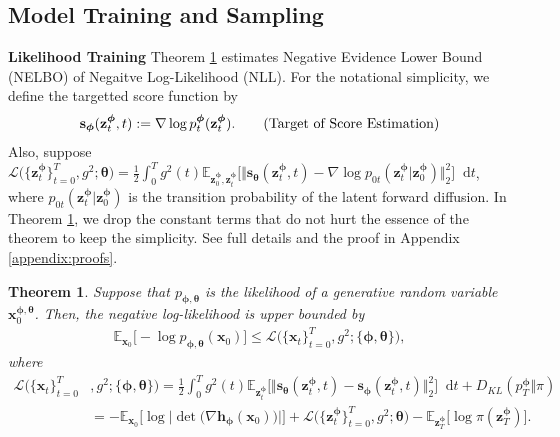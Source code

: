 \documentclass{article}
\newtheorem{theorem}{Theorem}\newtheorem{proposition}{Proposition}
\theoremstyle{definition}
\theoremstyle{remark}
\newcommand*\diff{\mathop{}\!\mathrm{d}}
\begin{document}
	
	
	\subsection{Model Training and Sampling}
	
	\textbf{Likelihood Training} Theorem \ref{thm:1} estimates Negative Evidence Lower Bound (NELBO) of Negaitve Log-Likelihood (NLL). For the notational simplicity, we define the targetted score function by
	\begin{align*}
	\mathbf{s}_{\bm{\phi}}(\mathbf{z}_{t}^{\bm{\phi}},t):=\nabla\log{p_{t}^{\bm{\phi}}(\mathbf{z}_{t}^{\bm{\phi}})}.\tag{\text{Target of Score Estimation}}
	\end{align*}
	Also, suppose $\mathcal{L}\big(\{\mathbf{z}_{t}^{\bm{\phi}}\}_{t=0}^{T},g^{2};\bm{\theta}\big)=\frac{1}{2}\int_{0}^{T}g^{2}(t)\mathbb{E}_{\mathbf{z}_{0}^{\bm{\phi}},\mathbf{z}_{t}^{\bm{\phi}}}\big[\Vert\mathbf{s}_{\bm{\theta}}(\mathbf{z}_{t}^{\bm{\phi}},t)-\nabla\log{p_{0t}(\mathbf{z}_{t}^{\bm{\phi}}\vert\mathbf{z}_{0}^{\bm{\phi}})}\Vert_{2}^{2}\big]\diff t$, where $p_{0t}(\mathbf{z}_{t}^{\bm{\phi}}\vert\mathbf{z}_{0}^{\bm{\phi}})$ is the transition probability of the latent forward diffusion. In Theorem \ref{thm:1}, we drop the constant terms that do not hurt the essence of the theorem to keep the simplicity. See full details and the proof in Appendix \ref{appendix:proofs}.
	\reqnomode
	\begin{theorem}\label{thm:1}
		Suppose that $p_{\bm{\phi},\bm{\theta}}$ is the likelihood of a generative random variable $\mathbf{x}_{0}^{\bm{\phi},\bm{\theta}}$. Then, the negative log-likelihood is upper bounded by
		\begin{align*}
		\mathbb{E}_{\mathbf{x}_{0}}\big[-\log{p_{\bm{\phi},\bm{\theta}}(\mathbf{x}_{0})}\big]\le\mathcal{L}\big(\{\mathbf{x}_{t}\}_{t=0}^{T},g^{2};\{\bm{\phi},\bm{\theta}\}\big),
		\end{align*}
		where
		\begin{align}
		\mathcal{L}\big(\{\mathbf{x}_{t}\}_{t=0}^{T}&,g^{2};\{\bm{\phi},\bm{\theta}\}\big)=\frac{1}{2}\int_{0}^{T}g^{2}(t)\mathbb{E}_{\mathbf{z}_{t}^{\bm{\phi}}}\big[\Vert\mathbf{s}_{\bm{\theta}}(\mathbf{z}_{t}^{\bm{\phi}},t)-\mathbf{s}_{\bm{\phi}}(\mathbf{z}_{t}^{\bm{\phi}},t)\Vert_{2}^{2}\big]\diff t+D_{KL}(p_{T}^{\bm{\phi}}\Vert \pi)\label{main_eq:nelbo}\\[1ex]
		&=-\mathbb{E}_{\mathbf{x}_{0}}\big[\log{\big\vert\det\big(\nabla\mathbf{h}_{\bm{\phi}}(\mathbf{x}_{0})\big)\big\vert}\big]+\mathcal{L}\big(\{\mathbf{z}_{t}^{\bm{\phi}}\}_{t=0}^{T},g^{2};\bm{\theta}\big)-\mathbb{E}_{\mathbf{z}_{T}^{\bm{\phi}}}\big[\log{\pi(\mathbf{z}_{T}^{\bm{\phi}})}\big].\label{main_eq:training_loss}
		\end{align}
	\end{theorem}
\end{document}
